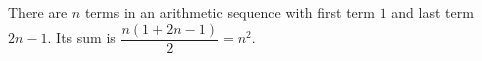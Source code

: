 There are $n$ terms in an arithmetic sequence with first term $1$ and last term $2n-1$. Its sum is $\dfrac{n(1+2n-1)}{2}=\boxed{n^2}$.
